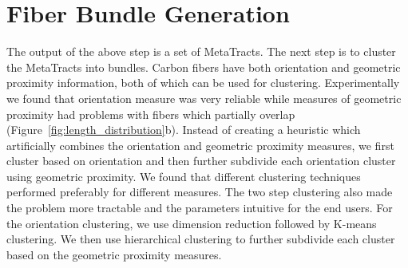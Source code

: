 \section {Fiber Bundle Generation}
\label{subsec:fiber-bundles}

The output of the above step is a set of MetaTracts. The next step is to cluster the MetaTracts into bundles. 
Carbon fibers have both orientation and geometric proximity information, both of which can be used for clustering. Experimentally we found that orientation measure was very reliable while measures of geometric proximity had problems with fibers which partially overlap (Figure~\ref{fig:length_distribution}b).  
Instead of creating a heuristic which artificially combines the orientation and geometric proximity measures, we first cluster based on orientation and then further subdivide each orientation cluster using geometric proximity.
We found that different clustering techniques performed preferably for different measures.  The two step clustering also made the problem more tractable and  the parameters intuitive for the end users. For the orientation clustering, we use dimension reduction followed by K-means clustering. We then use hierarchical clustering to further subdivide each cluster based on the geometric proximity measures. 



